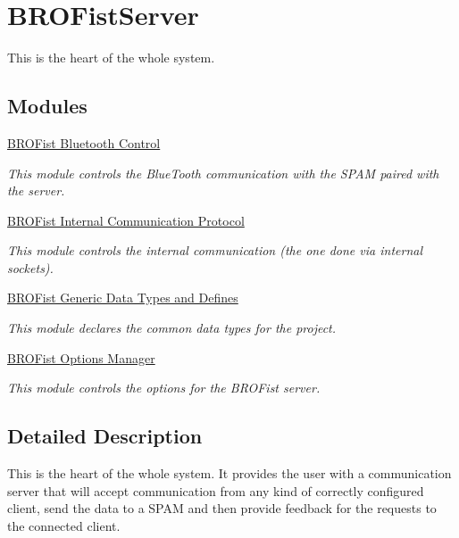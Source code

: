 \hypertarget{group___b_r_o_fist_server}{
\section{BROFistServer}
\label{group___b_r_o_fist_server}
}


This is the heart of the whole system.  


\subsection*{Modules}
\begin{DoxyCompactItemize}
\item 
\hyperlink{group___bro_b_t}{BROFist Bluetooth Control}


\begin{DoxyCompactList}\small\item\em This module controls the BlueTooth communication with the SPAM paired with the server. \item\end{DoxyCompactList}

\item 
\hyperlink{group___bro_comm}{BROFist Internal Communication Protocol}


\begin{DoxyCompactList}\small\item\em This module controls the internal communication (the one done via internal sockets). \item\end{DoxyCompactList}

\item 
\hyperlink{group___bro_fist}{BROFist Generic Data Types and Defines}


\begin{DoxyCompactList}\small\item\em This module declares the common data types for the project. \item\end{DoxyCompactList}

\item 
\hyperlink{group___b_r_o_opts}{BROFist Options Manager}


\begin{DoxyCompactList}\small\item\em This module controls the options for the BROFist server. \item\end{DoxyCompactList}

\end{DoxyCompactItemize}


\subsection{Detailed Description}
This is the heart of the whole system. It provides the user with a communication server that will accept communication from any kind of correctly configured client, send the data to a SPAM and then provide feedback for the requests to the connected client. 